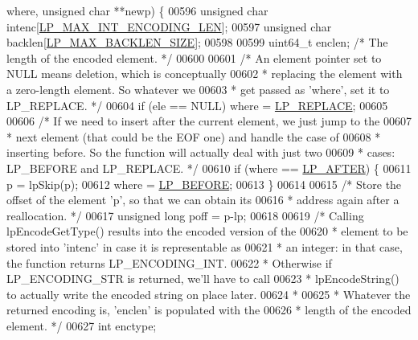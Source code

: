 \begin{DoxyCode}
{      where, \textcolor{keywordtype}{unsigned} \textcolor{keywordtype}{char} **newp) \{
00596     \textcolor{keywordtype}{unsigned} \textcolor{keywordtype}{char} intenc[\hyperlink{listpack_8c_a915406ff900007462e93d6db78ecd503}{LP\_MAX\_INT\_ENCODING\_LEN}];
00597     \textcolor{keywordtype}{unsigned} \textcolor{keywordtype}{char} backlen[\hyperlink{listpack_8c_a366cd2ebf1ab1f0266b6629d52e9a35d}{LP\_MAX\_BACKLEN\_SIZE}];
00598 
00599     uint64\_t enclen; \textcolor{comment}{/* The length of the encoded element. */}
00600 
00601     \textcolor{comment}{/* An element pointer set to NULL means deletion, which is conceptually}
00602 \textcolor{comment}{     * replacing the element with a zero-length element. So whatever we}
00603 \textcolor{comment}{     * get passed as 'where', set it to LP\_REPLACE. */}
00604     \textcolor{keywordflow}{if} (ele == NULL) where = \hyperlink{listpack_8h_a29d3b9a55d47053582a5025dd85d7fe6}{LP\_REPLACE};
00605 
00606     \textcolor{comment}{/* If we need to insert after the current element, we just jump to the}
00607 \textcolor{comment}{     * next element (that could be the EOF one) and handle the case of}
00608 \textcolor{comment}{     * inserting before. So the function will actually deal with just two}
00609 \textcolor{comment}{     * cases: LP\_BEFORE and LP\_REPLACE. */}
00610     \textcolor{keywordflow}{if} (where == \hyperlink{listpack_8h_ab57438590a2e825529df34cf1174a3a5}{LP\_AFTER}) \{
00611         p = lpSkip(p);
00612         where = \hyperlink{listpack_8h_a64de9ded0fe5ccb80bc2bc9fb8c6c3b2}{LP\_BEFORE};
00613     \}
00614 
00615     \textcolor{comment}{/* Store the offset of the element 'p', so that we can obtain its}
00616 \textcolor{comment}{     * address again after a reallocation. */}
00617     \textcolor{keywordtype}{unsigned} \textcolor{keywordtype}{long} poff = p-lp;
00618 
00619     \textcolor{comment}{/* Calling lpEncodeGetType() results into the encoded version of the}
00620 \textcolor{comment}{     * element to be stored into 'intenc' in case it is representable as}
00621 \textcolor{comment}{     * an integer: in that case, the function returns LP\_ENCODING\_INT.}
00622 \textcolor{comment}{     * Otherwise if LP\_ENCODING\_STR is returned, we'll have to call}
00623 \textcolor{comment}{     * lpEncodeString() to actually write the encoded string on place later.}
00624 \textcolor{comment}{     *}
00625 \textcolor{comment}{     * Whatever the returned encoding is, 'enclen' is populated with the}
00626 \textcolor{comment}{     * length of the encoded element. */}
00627     \textcolor{keywordtype}{int} enctype;
}
\end{DoxyCode}
